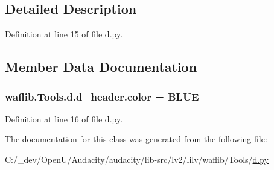 \subsection{Detailed Description}


Definition at line 15 of file d.\+py.



\subsection{Member Data Documentation}
\subsubsection[{\texorpdfstring{color}{color}}]{ waflib.\+Tools.\+d.\+d\+\_\+header.\+color = \textquotesingle{}B\+L\+UE\textquotesingle{}\hspace{0.3cm}{\ttfamily [static]}}\hypertarget{classwaflib_1_1_tools_1_1d_1_1d__header_ae3ae6ab484b020b6e851de770bb8a3b7}{}\label{classwaflib_1_1_tools_1_1d_1_1d__header_ae3ae6ab484b020b6e851de770bb8a3b7}


Definition at line 16 of file d.\+py.



The documentation for this class was generated from the following file\+:\begin{DoxyCompactItemize}
\item 
C\+:/\+\_\+dev/\+Open\+U/\+Audacity/audacity/lib-\/src/lv2/lilv/waflib/\+Tools/\hyperlink{lilv_2waflib_2_tools_2d_8py}{d.\+py}\end{DoxyCompactItemize}
